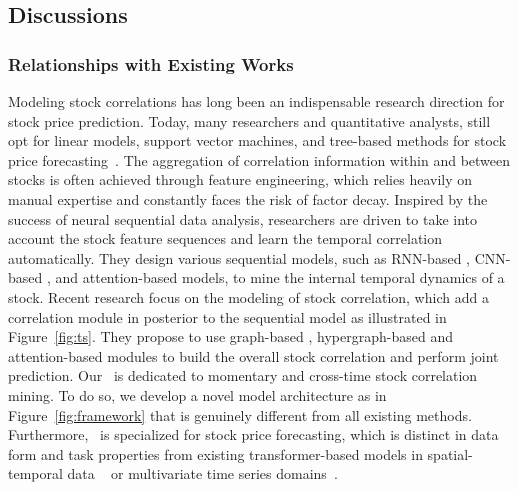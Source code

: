 \subsection{Discussions}
\subsubsection{Relationships with Existing Works}
Modeling stock correlations has long been an indispensable research direction for stock price prediction. Today, many researchers and quantitative analysts, still opt for linear models, support vector machines, and tree-based methods for stock price forecasting~\cite{nugroho2014decision,chen2016xgboost,kamble2017short,xie2013semantic,li2015tensor, piccolo1990distance}. The aggregation of correlation information within and between stocks is often achieved through feature engineering, which relies heavily on manual expertise and constantly faces the risk of factor decay.
Inspired by the success of neural sequential data analysis, researchers are driven to take into account the stock feature sequences and learn the temporal correlation automatically. 
They design various sequential models, such as RNN-based \cite{feng2019temporal, sawhney2021stock, yoo2021accurate, huynh2023efficient}, CNN-based \cite{wang2021hierarchical}, and attention-based models\cite{liu2019transformer, ding2020hierarchical}, to mine the internal temporal dynamics of a stock. 
Recent research focus on the modeling of stock correlation, which add a correlation module in posterior to the sequential model as illustrated in Figure~\ref{fig:ts}.
They propose to use graph-based \cite{feng2019temporal, xu2021hist,wang2021hierarchical, wang2022adaptive}, hypergraph-based \cite{sawhney2021stock,huynh2023efficient} and attention-based \cite{yoo2021accurate, xiang2022temporal} modules to build the overall stock correlation and perform joint prediction. 
Our \frameworkname~is dedicated to momentary and cross-time stock correlation mining. To do so, we develop a novel model architecture as in Figure~\ref{fig:framework} that is genuinely different from all existing methods. 
Furthermore, \frameworkname~is specialized for stock price forecasting, which is distinct in data form and task properties from existing transformer-based models in spatial-temporal data ~\cite{bulat2021space, cong2021spatial, xu2020spatial,li2023memory} or multivariate time series domains~\cite{zhang2022crossformer, nie2022time}.

